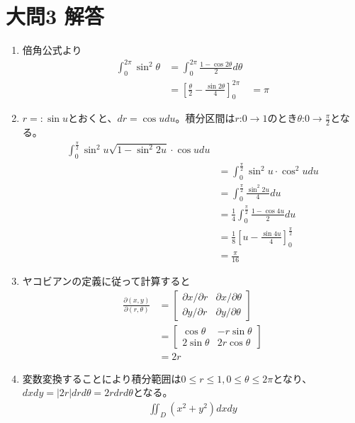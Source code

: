 \documentclass[dvipdfmx]{jsreport}
\begin{document}
\section{大問3 解答}
\begin{souanswer} %
\begin{enumerate}
    \item 倍角公式より
\begin{align*}
    \int_0^{2\pi} \sin^2{\theta}
    &= \int_0^{2\pi} \frac{1- \cos{2\theta}}{2}d\theta\\
    &= \left[\frac{\theta}{2}- \frac{\sin{2\theta}}{4}\right]_0^{2\pi}
    &= \pi
\end{align*}
    \item $r= :\sin{u}$とおくと、$dr= \cos{u}du$。積分区間は$r$:$0\to 1$のとき$\theta$:$0\to \frac{\pi}{2}$となる。
\begin{align*}
    \int_0^{\frac{\pi}{2}} \sin^2{u}\sqrt{1- \sin^2{2u}}\cdot \cos{u}du\\
    &= \int_0^{\frac{\pi}{2}} \sin^2{u}\cdot \cos^2{u}du\\
    &= \int_0^{\frac{\pi}{2}} \frac{\sin^2{2u}}{4}du\\
    &= \frac{1}{4}\int_0^{\frac{\pi}{2}}\frac{1- \cos{4u}}{2}du\\
    &= \frac{1}{8}\left[u- \frac{\sin{4u}}{4}\right]_0^{\frac{\pi}{2}}\\
    &= \frac{\pi}{16}
\end{align*}
    \item ヤコビアンの定義に従って計算すると
\begin{align*}
    \frac{\partial (x, y)}{\partial (r, \theta)}
    &= \begin{bmatrix}\partial x/\partial r& \partial x/\partial \theta\\ \partial y/\partial r& \partial y/\partial \theta\end{bmatrix}\\
    &= \begin{bmatrix}\cos{\theta}& -r\sin{\theta}\\ 2\sin{\theta}& 2r\cos{\theta}\end{bmatrix}\\
    &= 2r
\end{align*}
    \item 変数変換することにより積分範囲は$0\le r\le 1, 0\le \theta\le 2\pi$となり、$dxdy= |2r|drd\theta= 2rdrd\theta$となる。
\begin{align*}
    \iint_D (x^2+ y^2)dxdy\\

\end{align*}
\end{enumerate}
\end{souanswer}
\end{document}
